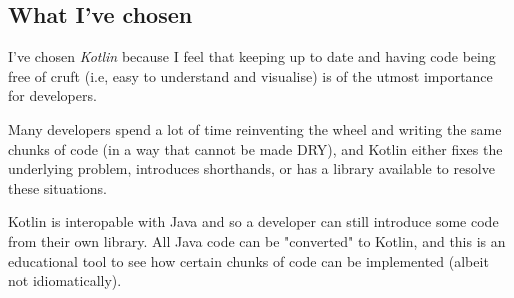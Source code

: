 \documentclass[a4paper]{article}
\begin{document}
\subsection{What I've chosen}
I've chosen \emph{Kotlin} because I feel that keeping up to date and having code being free of cruft (i.e, easy to understand and visualise) is of the utmost importance for developers.

Many developers spend a lot of time reinventing the wheel and writing the same chunks of code (in a way that cannot be made DRY), and Kotlin either fixes the underlying problem, introduces shorthands, or has a library available to resolve these situations.

Kotlin is interopable with Java\cite{javainterop} and so a developer can still introduce some code from their own library. All Java code can be "converted" to Kotlin\cite{javatokotlin}, and this is an educational tool to see how certain chunks of code can be implemented (albeit not idiomatically).
\pagebreak
\end{document}
